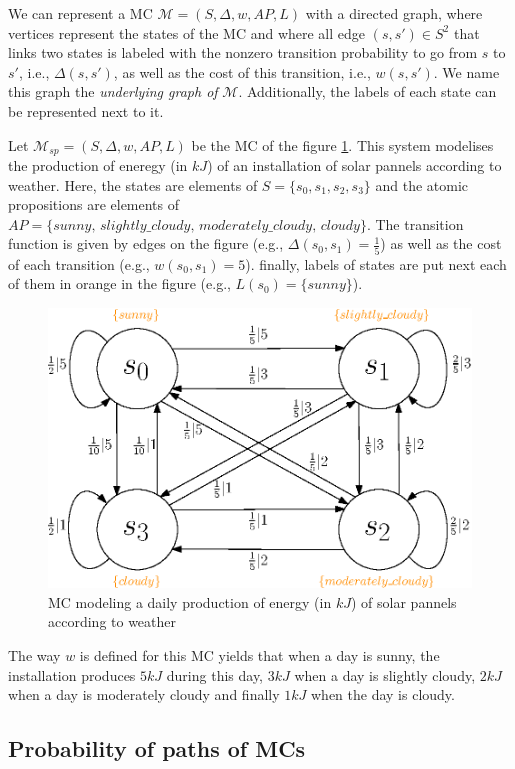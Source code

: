 We can represent a MC $\mathcal{M} = (S, \Delta, w, AP, L)$ with a directed graph, where vertices represent the states
of the MC and where all edge $(s, s') \in S^2$ that links two states is labeled with the nonzero transition probability to go from $s$ to $s'$, i.e., $\Delta(s, s')$, as well as the cost of this transition, i.e., $w(s, s')$.
We name this graph the \textit{underlying graph of} $\mathcal{M}$.
Additionally, the labels of each
state can be represented next to it.

\begin{example}\label{solar-pannel}
  Let $\mathcal{M}_{sp} = (S, \Delta, w, AP, L)$ be the MC of the figure \ref{MCexample}. This system modelises the production of eneregy (in $kJ$) of
  an installation of solar pannels according to weather.
  Here, the states are elements of $S = \{s_0, s_1, s_2, s_3\}$ and the atomic propositions are elements of $AP = \{sunny, \, slightly\_cloudy, \, moderately\_cloudy, \, cloudy \}$. The transition function is given by edges on the figure (e.g., $\Delta(s_0, s_1) = \frac{1}{5}$) as well as the
  cost of each transition (e.g., $w(s_0, s_1) = 5$). finally, labels of states
  are put next each of them in orange in the figure (e.g., $L(s_0) = \{sunny\}$).
  \begin{figure}[h!]
    \centering
    \includegraphics[width=0.6\linewidth]{resources/weather-solar-pannel}
    \caption{MC modeling a daily production of energy (in $kJ$) of solar pannels according to weather}
    \label{MCexample}
  \end{figure}
  The way $w$ is defined for this MC yields that when a day is sunny, the installation produces $5 kJ$ during this day, $3 kJ$ when a day is slightly cloudy, $2 kJ$ when a day is moderately cloudy and finally $1 kJ$ when the day is cloudy.
\end{example}

\subsection{Probability of paths of MCs}

